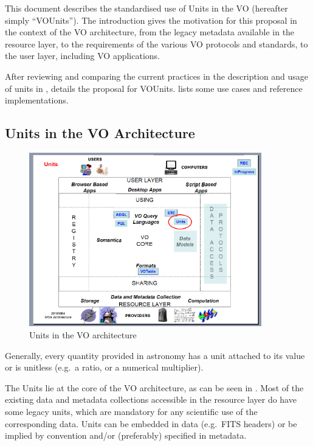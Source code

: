 \documentclass[12pt,notitlepage,onecolumn]{ivoa}
\def\eg{e.g.~}
\begin{document}
This document describes the standardised use of Units in the VO
(hereafter simply ``VOUnits''). The introduction gives the motivation for
this proposal in the context of the VO architecture, from the legacy 
metadata available in the resource layer, to the requirements of the various 
VO protocols and standards, to the user layer, including VO applications.

After reviewing and comparing the current practices in the description and usage of units
in ,  details the proposal for
VOUnits.  lists some use cases and reference implementations.


\subsection{Units in the VO Architecture}

\begin{figure}[htbp]
  \centerline{\includegraphics[width=0.9\textwidth]{unitsInIVOA.png}}
  \caption{Units in the VO architecture}
  \label{fig:architecture}
\end{figure}

Generally, every quantity provided in astronomy has a unit attached to
its value or is unitless (\eg a ratio, or a numerical multiplier).  

The Units lie at the core of the VO architecture, as can be seen in .
Most of the existing data and metadata collections accessible in the resource
layer do have some legacy units, which are mandatory for any scientific use of
the corresponding data.  Units can be embedded in data (\eg FITS headers) or be
implied by convention and/or (preferably) specified in metadata.
\end{document}
